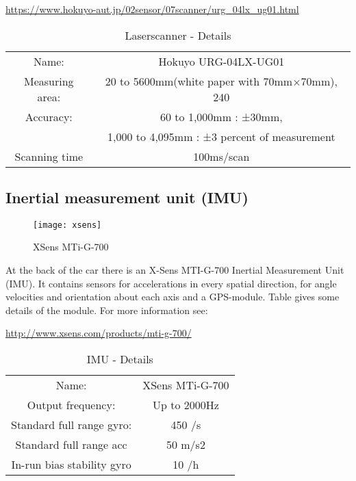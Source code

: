 \hyperref[https://www.hokuyo-aut.jp/02sensor/07scanner/urg_04lx_ug01.html]{https://www.hokuyo-aut.jp/02sensor/07scanner/urg\_04lx\_ug01.html}

\begin{table}[h]
	\centering	
	\begin{tabular}{cc} %
		\hline 
		Name: & Hokuyo URG-04LX-UG01 \\
		Measuring area: & 20 to 5600mm(white paper with 70mm×70mm), 240\textdegree \\
		Accuracy: & 60 to 1,000mm : ±30mm, \\
							&	1,000 to 4,095mm : ±3 percent of measurement \\
		Scanning time & 100ms/scan \\
		\hline
	\end{tabular}
	\caption{Laserscanner - Details} %
	\label{tab:laser_details}
\end{table}


\newpage
\subsection{Inertial measurement unit (IMU)}
\label{sec:overview_imu}

\begin{figure}[h]
	\centering
		\texttt{[image: xsens]}
	\caption{XSens MTi-G-700}
	\label{fig:xsens}
\end{figure}

At the back of the car there is an X-Sens MTI-G-700 Inertial Measurement Unit (IMU). It contains sensors for accelerations in every spatial direction, for angle velocities and orientation about each axis and a GPS-module. Table  gives some details of the module. For more information see: 

\hyperref[http://www.xsens.com/products/mti-g-700/]{http://www.xsens.com/products/mti-g-700/}

\begin{table}[h]
	\centering	
	\begin{tabular}{cc} %
		\hline 
		Name: & XSens MTi-G-700 \\
		Output frequency: & Up to 2000Hz \\
		Standard full range gyro: & 450 \textdegree/s \\
		Standard full range acc		& 50 m/s2 \\
		In-run bias stability gyro& 10 \textdegree/h \\
		\hline
	\end{tabular}
	\caption{IMU - Details} %
	\label{tab:imu_details}
\end{table}




